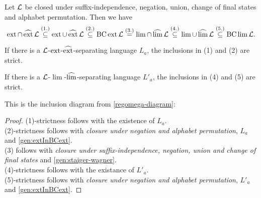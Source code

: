 \begin{samepage}
\begin{mdframed}
\begin{theorem}
\label{gen:main-theorem-inclusions}
Let $\mathcal{L}$ be closed under suffix-independence, negation, union, change of final states and alphabet permutation.
Then we have
\[ \operatorname{ext} \cap \operatorname{\widehat{ext}} \mathcal{L} \stackrel{(1.)}\subseteq
\operatorname{ext} \cup \operatorname{\widehat{ext}} \mathcal{L} \stackrel{(2.)}\subseteq
\operatorname{BC} \operatorname{ext} \mathcal{L} \stackrel{(3.)}=
\lim \cap \operatorname{\widehat{lim}} \mathcal{L} \stackrel{(4.)}\subseteq
\lim \cup \operatorname{\widehat{lim}} \mathcal{L} \stackrel{(5.)}\subseteq
\operatorname{BC} \lim \mathcal{L} . \]

If there is a $\mathcal{L}$-$\operatorname{ext}$-$\operatorname{\widehat{ext}}$-separating language $L_a$, the inclusions in (1) and (2) are strict.

If there is a $\mathcal{L}$-$\lim$-$\operatorname{\widehat{lim}}$-separating language $L'_a$, the inclusions in (4) and (5) are strict.
\end{theorem}

This is the inclusion diagram from \cref{regomega-diagram}:

\begin{center}
\end{center}
\end{mdframed}
\end{samepage}

\begin{proof}
(1)-strictness follows with the existence of $L_a$. \\
(2)-strictness follows with \emph{closure under negation and alphabet permutation}, $L_a$ and \cref{gen:extInBCext}. \\
(3) follows with \emph{closure under suffix-independence, negation, union and change of final states} and \cref{gen:staiger-wagner}. \\
(4)-strictness follows with the existance of $L'_a$. \\
(5)-strictness follows with \emph{closure under negation and alphabet permutation}, $L'_a$ and \cref{gen:extInBCext}.
\end{proof}

